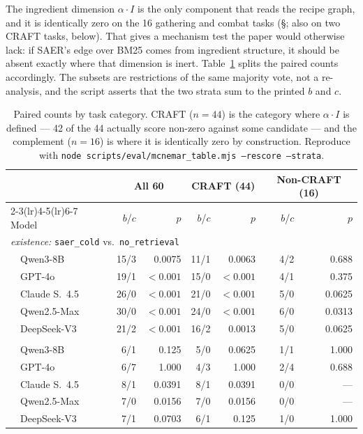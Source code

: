 \documentclass[letterpaper]{article} %
\newcommand{\bodyref}[1]{\getrefnumber{#1}}
\begin{document}
The ingredient dimension $\alpha{\cdot}I$ is the only component that reads the
recipe graph, and it is identically zero on the 16 gathering and combat tasks
(\S\bodyref{sec:scoring}; also on two CRAFT tasks, below).  That gives a mechanism test the paper would otherwise
lack: if SAER's edge over BM25 comes from ingredient structure, it should be
absent exactly where that dimension is inert.  Table~\ref{tab:strata} splits
the paired counts accordingly.  The subsets are restrictions of the same
majority vote, not a re-analysis, and the script asserts that the two strata
sum to the printed $b$ and $c$.

\begin{table}[htbp]
\caption{Paired counts by task category.  CRAFT ($n{=}44$) is the category
where $\alpha{\cdot}I$ is defined --- 42 of the 44 actually score non-zero
against some candidate --- and the complement ($n{=}16$) is where it is
identically zero by construction.  Reproduce with
\texttt{node scripts/eval/mcnemar\_table.mjs --rescore --strata}.}
\label{tab:strata}
\small\setlength{\tabcolsep}{5pt}
\centering
\begin{tabular}{lrrrrrr}
\toprule
& \multicolumn{2}{c}{All 60} & \multicolumn{2}{c}{CRAFT (44)} & \multicolumn{2}{c}{Non-CRAFT (16)} \\
\cmidrule(lr){2-3}\cmidrule(lr){4-5}\cmidrule(lr){6-7}
Model & $b$/$c$ & $p$ & $b$/$c$ & $p$ & $b$/$c$ & $p$ \\
\midrule
\multicolumn{7}{l}{\emph{existence:} \texttt{saer\_cold} vs.\ \texttt{no\_retrieval}} \\
~~Qwen3-8B      & 15/3 & 0.0075 & 11/1 & 0.0063 & 4/2 & 0.688 \\
~~GPT-4o        & 19/1 & ${<}0.001$ & 15/0 & ${<}0.001$ & 4/1 & 0.375 \\
~~Claude S.\ 4.5 & 26/0 & ${<}0.001$ & 21/0 & ${<}0.001$ & 5/0 & 0.0625 \\
~~Qwen2.5-Max   & 30/0 & ${<}0.001$ & 24/0 & ${<}0.001$ & 6/0 & 0.0313 \\
~~DeepSeek-V3   & 21/2 & ${<}0.001$ & 16/2 & 0.0013 & 5/0 & 0.0625 \\
\addlinespace
\multicolumn{7}{l}{\emph{relevance:} \texttt{saer\_cold} vs.\ \texttt{bm25}} \\
~~Qwen3-8B      & 6/1 & 0.125 & 5/0 & 0.0625 & 1/1 & 1.000 \\
~~GPT-4o        & 6/7 & 1.000 & 4/3 & 1.000 & 2/4 & 0.688 \\
~~Claude S.\ 4.5 & 8/1 & 0.0391 & 8/1 & 0.0391 & 0/0 & --- \\
~~Qwen2.5-Max   & 7/0 & 0.0156 & 7/0 & 0.0156 & 0/0 & --- \\
~~DeepSeek-V3   & 7/1 & 0.0703 & 6/1 & 0.125 & 1/0 & 1.000 \\
\bottomrule
\end{tabular}
\end{table}
\end{document}
